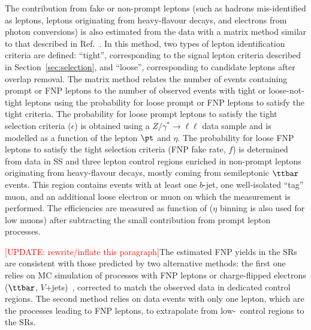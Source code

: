 The contribution from fake or non-prompt leptons (such as hadrons mis-identified as leptons, 
leptons originating from heavy-flavour decays, and electrons from photon conversions) 
is also estimated from the data with a matrix method similar to that described in Ref.~\cite{SUSY3bjetsRun1}. 
In this method, two types of lepton identification criteria are defined: ``tight'', 
corresponding to the signal lepton criteria described in Section~\ref{sec:selection}, 
and ``loose'', corresponding to candidate leptons after overlap removal. 
The matrix method relates the number of events containing prompt or FNP leptons 
to the number of observed events with tight or loose-not-tight leptons 
using the probability for loose prompt or FNP leptons to satisfy the tight criteria. 
The probability for loose prompt leptons to satisfy the tight selection criteria ($\epsilon$)
is obtained using a $Z/\gamma^*\to\ell\ell$ data sample 
and is modelled as a function of the lepton $\pt$ and $\eta$. 
The probability for loose FNP leptons to satisfy the tight selection criteria (FNP fake rate, $f$) is determined from data 
in SS and three lepton control regions enriched in non-prompt leptons originating from heavy-flavour decays, mostly coming from 
semileptonic $\ttbar$ events. This region contains events with at least one $b$-jet, 
one well-isolated ``tag'' muon, and an additional loose electron or muon on which the measurement is performed. 
The efficiencies are measured as function of \pt ($\eta$ binning is also used for low \pt muons) 
after subtracting the small contribution from prompt lepton processes. 

\textcolor{red}{[UPDATE: rewrite/inflate this paragraph]}The estimated FNP yields in the SRs are consistent with those 
predicted by two alternative methods: the first one relies on MC simulation of processes with FNP leptons or charge-flipped electrons 
($\ttbar$, $V$+jets)~\cite{paperSS3L,ATLAS-CONF-2012-151}, 
corrected to match the observed data in dedicated control regions. 
The second method relies on data events with only one lepton, which are the processes leading to FNP leptons, 
to extrapolate from low-\met\ control regions to the SRs.


